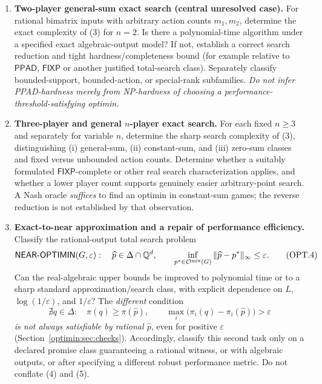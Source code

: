 \documentclass[11pt,a4paper]{article}
\providecommand{\D}{\Delta}
\providecommand{\Opt}{\mathcal O}
\providecommand{\Q}{\mathbb Q}
\providecommand{\PPAD}{\mathsf{PPAD}}
\providecommand{\FIXP}{\mathsf{FIXP}}
\begin{document}
\begin{enumerate}[label=\textbf{(\Alph*)},leftmargin=2.8em,itemsep=11pt]
\item \textbf{Two-player general-sum exact search (central unresolved case).}
For rational bimatrix inputs with arbitrary action counts $m_1,m_2$, determine the exact complexity of (3) for $n=2$. Is there a polynomial-time algorithm under a specified exact algebraic-output model? If not, establish a correct search reduction and tight hardness/completeness bound (for example relative to $\PPAD$, $\FIXP$ or another justified total-search class). Separately classify bounded-support, bounded-action, or special-rank subfamilies. \emph{Do not infer PPAD-hardness merely from NP-hardness of choosing a performance-threshold-satisfying optimin.}

\item \textbf{Three-player and general $n$-player exact search.}
For each fixed $n\ge3$ and separately for variable $n$, determine the sharp search complexity of (3), distinguishing (i) general-sum, (ii) constant-sum, and (iii) zero-sum classes and fixed versus unbounded action counts. Determine whether a suitably formulated $\FIXP$-complete or other real search characterization applies, and whether a lower player count supports genuinely easier arbitrary-point search. A Nash oracle \emph{suffices} to find an optimin in constant-sum games; the reverse reduction is not established by that observation.

\item \textbf{Exact-to-near approximation and a repair of performance efficiency.}
Classify the rational-output total search problem
\[
 \mathsf{NEAR\text{-}OPTIMIN}(G,\varepsilon):\quad
 \widehat p\in\D\cap\Q^d,\qquad
 \inf_{p^*\in\Opt^{\rm mix}(G)}\|\widehat p-p^*\|_\infty\le\varepsilon.
\tag{OPT.4}
\]
Can the real-algebraic upper bounds be improved to polynomial time or to a sharp standard approximation/search class, with explicit dependence on $L$, $\log(1/\varepsilon)$, and $1/\varepsilon$?
The \emph{different} condition
\[
 \nexists q\in\D:\quad\pi(q)\ge\pi(\widehat p),\qquad
 \max_i\bigl(\pi_i(q)-\pi_i(\widehat p)\bigr)>\varepsilon
\tag{OPT.5}
\]
\emph{is not always satisfiable by rational $\widehat p$}, even for positive $\varepsilon$ (Section~\ref{optimin:sec:checks}). Accordingly, classify this second task only on a declared promise class guaranteeing a rational witness, or with algebraic outputs, or after specifying a different robust performance metric. Do not conflate (4) and (5).


\end{enumerate}
\end{document}
